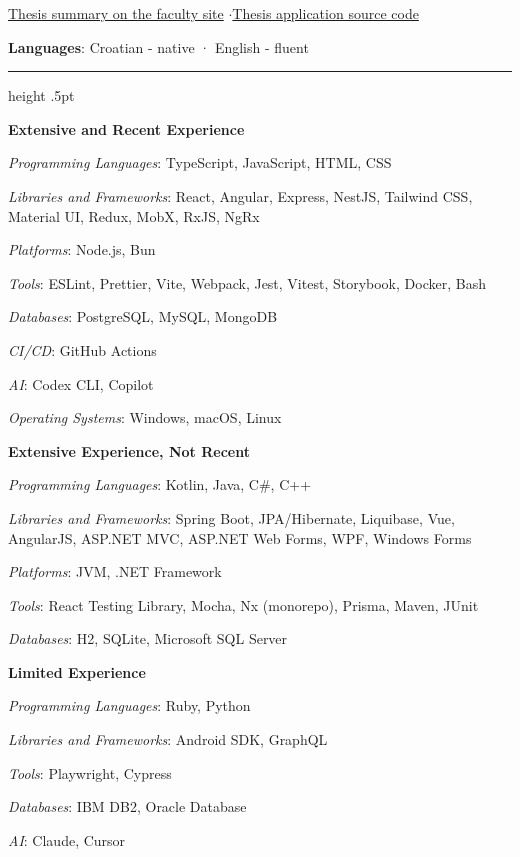 \documentclass[11pt,a4paper]{article}
\newcommand{\cvsection}[1]{\par\addvspace{14pt}{\large\bfseries #1}\par\nopagebreak\vskip 3pt{\color{accent}\hrule height .5pt}\vskip 6pt\nopagebreak}
\begin{document}
\href{http://www.zemris.fer.hr/predmeti/rg/diplomski/08Mrzljak/bvhviewer_pages/html/index.html}{Thesis summary on the faculty site} \enspace $\cdot$\enspace \href{https://github.com/mrzli/bvhviewer}{Thesis application source code}
\par
\textbf{Languages}: Croatian - native · English - fluent\par
\cvsection{Skills}\begingroup\setlength{\parskip}{2pt}
\par\addvspace{9pt}\textbf{Extensive and Recent Experience}\par\nopagebreak
\textit{Programming Languages}: TypeScript, JavaScript, HTML, CSS\par
\textit{Libraries and Frameworks}: React, Angular, Express, NestJS, Tailwind CSS, Material UI, Redux, MobX, RxJS, NgRx\par
\textit{Platforms}: Node.js, Bun\par
\textit{Tools}: ESLint, Prettier, Vite, Webpack, Jest, Vitest, Storybook, Docker, Bash\par
\textit{Databases}: PostgreSQL, MySQL, MongoDB\par
\textit{CI/CD}: GitHub Actions\par
\textit{AI}: Codex CLI, Copilot\par
\textit{Operating Systems}: Windows, macOS, Linux\par
\par\addvspace{9pt}\textbf{Extensive Experience, Not Recent}\par\nopagebreak
\textit{Programming Languages}: Kotlin, Java, C\#, C++\par
\textit{Libraries and Frameworks}: Spring Boot, JPA/Hibernate, Liquibase, Vue, AngularJS, ASP.NET MVC, ASP.NET Web Forms, WPF, Windows Forms\par
\textit{Platforms}: JVM, .NET Framework\par
\textit{Tools}: React Testing Library, Mocha, Nx (monorepo), Prisma, Maven, JUnit\par
\textit{Databases}: H2, SQLite, Microsoft SQL Server\par
\par\addvspace{9pt}\textbf{Limited Experience}\par\nopagebreak
\textit{Programming Languages}: Ruby, Python\par
\textit{Libraries and Frameworks}: Android SDK, GraphQL\par
\textit{Tools}: Playwright, Cypress\par
\textit{Databases}: IBM DB2, Oracle Database\par
\textit{AI}: Claude, Cursor\par
\endgroup
\end{document}
